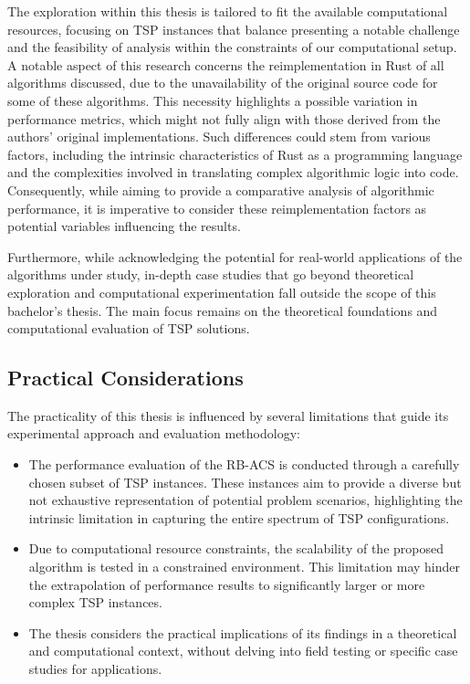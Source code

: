 The exploration within this thesis is tailored to fit the available computational resources, focusing on \Gls{TSP} instances that balance presenting a notable challenge and the feasibility of analysis within the constraints of our computational setup. A notable aspect of this research concerns the reimplementation in Rust of all algorithms discussed, due to the unavailability of the original source code for some of these algorithms. This necessity highlights a possible variation in performance metrics, which might not fully align with those derived from the authors' original implementations. Such differences could stem from various factors, including the intrinsic characteristics of Rust as a programming language and the complexities involved in translating complex algorithmic logic into code. Consequently, while aiming to provide a comparative analysis of algorithmic performance, it is imperative to consider these reimplementation factors as potential variables influencing the results.

Furthermore, while acknowledging the potential for real-world applications of the algorithms under study, in-depth case studies that go beyond theoretical exploration and computational experimentation fall outside the scope of this bachelor's thesis. The main focus remains on the theoretical foundations and computational evaluation of \Gls{TSP} solutions.

\subsection{Practical Considerations}

The practicality of this thesis is influenced by several limitations that guide its experimental approach and evaluation methodology:

\begin{itemize}
  \item The performance evaluation of the \Gls{RB-ACS} is conducted through a carefully chosen subset of \Gls{TSP} instances. These instances aim to provide a diverse but not exhaustive representation of potential problem scenarios, highlighting the intrinsic limitation in capturing the entire spectrum of \Gls{TSP} configurations.
	\item Due to computational resource constraints, the scalability of the proposed algorithm is tested in a constrained environment. This limitation may hinder the extrapolation of performance results to significantly larger or more complex \Gls{TSP} instances.
	\item The thesis considers the practical implications of its findings in a theoretical and computational context, without delving into field testing or specific case studies for applications.
\end{itemize}

